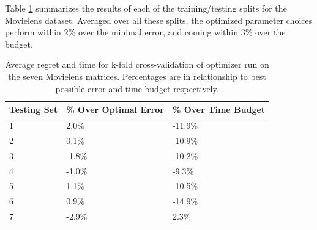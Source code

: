 Table \ref{fig:MovieCrossTable} summarizes the results of each of the 
training/testing splits for the Movielens dataset. Averaged over 
all these splits, the optimized parameter choices perform within 
$2\%$ over the minimal error, and coming 
within $3\%$ over the budget.

\begin{table}
\label{fig:MovieCrossTable}
\begin{center}
    \begin{tabular}{| p{2.2cm} | p{2.2cm} | p{2.2cm} |}
    \hline
    Testing Set & \% Over Optimal Error & \% Over Time Budget \\ \hline
    1 & 2.0\% & -11.9\% \\ \hline
    2 & 0.1\% & -10.9\% \\ \hline
    3 & -1.8\% & -10.2\% \\ \hline
    4 & -1.0\% & -9.3\% \\ \hline
    5 & 1.1\% & -10.5\% \\ \hline
    6 & 0.9\% & -14.9\% \\ \hline
    7 & -2.9\% & 2.3\% \\ \hline
    \end{tabular}
\end{center}
\caption{Average regret and time for k-fold cross-validation of optimizer run on the seven Movielens matrices. Percentages are in relationship to best possible error and time budget respectively.}
\end{table}


